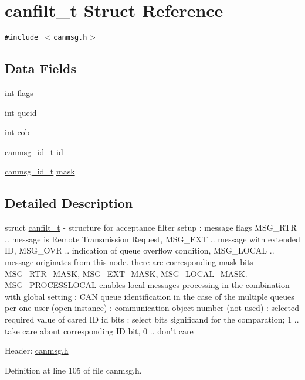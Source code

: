 \hypertarget{structcanfilt__t}{
\section{canfilt\_\-t Struct Reference}
\label{structcanfilt__t}
}
{\tt \#include $<$canmsg.h$>$}

\subsection*{Data Fields}
\begin{CompactItemize}
\item 
int \hyperlink{structcanfilt__t_fdcc03f2a187f0b468081815c2f709c3}{flags}
\item 
int \hyperlink{structcanfilt__t_02e22abff78f9bdfb42a957d5beb4130}{queid}
\item 
int \hyperlink{structcanfilt__t_7d6d90e3ba8c36b857306873b1584005}{cob}
\item 
\hyperlink{canmsg_8h_4df2eff676652dbe67d372e42ccf8aa7}{canmsg\_\-id\_\-t} \hyperlink{structcanfilt__t_f53a58f5928e6832631bae811a93b1fb}{id}
\item 
\hyperlink{canmsg_8h_4df2eff676652dbe67d372e42ccf8aa7}{canmsg\_\-id\_\-t} \hyperlink{structcanfilt__t_0b1650e86282ed67271c33475c9aa72a}{mask}
\end{CompactItemize}


\subsection{Detailed Description}
struct \hyperlink{structcanfilt__t}{canfilt\_\-t} - structure for acceptance filter setup : message flags MSG\_\-RTR .. message is Remote Transmission Request, MSG\_\-EXT .. message with extended ID, MSG\_\-OVR .. indication of queue overflow condition, MSG\_\-LOCAL .. message originates from this node. there are corresponding mask bits MSG\_\-RTR\_\-MASK, MSG\_\-EXT\_\-MASK, MSG\_\-LOCAL\_\-MASK. MSG\_\-PROCESSLOCAL enables local messages processing in the combination with global setting : CAN queue identification in the case of the multiple queues per one user (open instance) : communication object number (not used) : selected required value of cared ID id bits : select bits significand for the comparation; 1 .. take care about corresponding ID bit, 0 .. don't care

Header: \hyperlink{canmsg_8h}{canmsg.h} 



Definition at line 105 of file canmsg.h.

